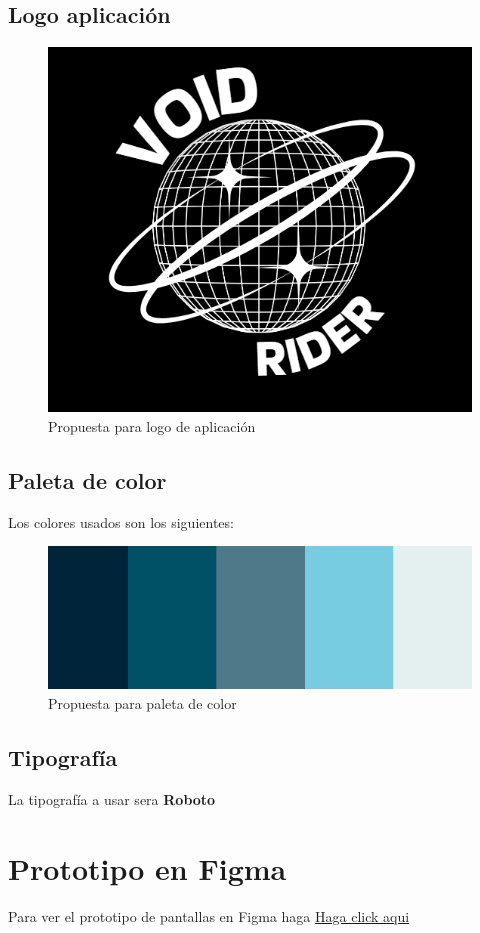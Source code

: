\documentclass[12pt]{article} %
\begin{document}
\subsection{Logo aplicación}
\begin{figure} [!htb]
  \includegraphics[width=\linewidth]{voidlogo.png}
  \caption{Propuesta para logo de aplicación}
\end{figure}
\FloatBarrier
\subsection{Paleta de color}
\par Los colores usados son los siguientes:
\begin{figure} [!htb]
  \includegraphics[width=\linewidth]{palette.png}
  \caption{Propuesta para paleta de color}
\end{figure}
\FloatBarrier
\subsection{Tipografía}
\par La tipografía a usar sera \textbf{Roboto} 

\section{Prototipo en Figma}\label{figma}
\par Para ver el prototipo de pantallas en Figma haga \href{https://www.figma.com/file/WSzbb8WSXLqrlPCmQUs2At/Void?type=design&node-id=0%3A1&mode=design&t=Xqxd5z7mG3mFrhSw-1}{Haga click aqui}
\end{document}
